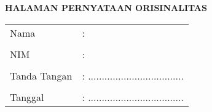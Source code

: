 \clearpage
{}%

\begin{center}
	\smallskip
	
	\normalsize \bfseries \MakeUppercase{Halaman Pernyataan Orisinalitas} \linebreak
	
	\normalsize {}
	\vspace{3cm}
	
	\centering 
	\begin{tabular}{l l}
		Nama 			& : \theauthor \\
		& \\
		NIM 			& : \printnim \\
		& \\
		Tanda Tangan 	& : ................................... \\
		& \\
		Tanggal 		& : ................................... \\
	\end{tabular}
	
\end{center}
\clearpage
